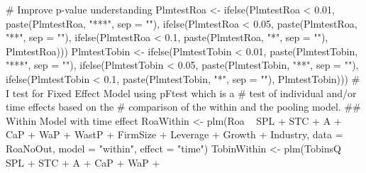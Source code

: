 \documentclass[12pt,]{article}
\newenvironment{Shaded}{}{}
\newcommand{\KeywordTok}[1]{\textcolor[rgb]{0.00,0.00,1.00}{#1}}
\newcommand{\DataTypeTok}[1]{#1}
\newcommand{\FloatTok}[1]{#1}
\newcommand{\StringTok}[1]{\textcolor[rgb]{0.00,0.50,0.50}{#1}}
\newcommand{\CommentTok}[1]{\textcolor[rgb]{0.00,0.50,0.00}{#1}}
\newcommand{\OperatorTok}[1]{#1}
\newcommand{\NormalTok}[1]{#1}
\begin{document}
\begin{Shaded}
\begin{Highlighting}[]
{{{{\CommentTok{# Improve p-value understanding}
\NormalTok{PlmtestRoa <-}\StringTok{ }\KeywordTok{ifelse}\NormalTok{(PlmtestRoa }\OperatorTok{<}\StringTok{ }\FloatTok{0.01}\NormalTok{, }\KeywordTok{paste}\NormalTok{(PlmtestRoa, }
    \StringTok{"***"}\NormalTok{, }\DataTypeTok{sep =} \StringTok{""}\NormalTok{), }\KeywordTok{ifelse}\NormalTok{(PlmtestRoa }\OperatorTok{<}\StringTok{ }\FloatTok{0.05}\NormalTok{, }\KeywordTok{paste}\NormalTok{(PlmtestRoa, }
    \StringTok{"**"}\NormalTok{, }\DataTypeTok{sep =} \StringTok{""}\NormalTok{), }\KeywordTok{ifelse}\NormalTok{(PlmtestRoa }\OperatorTok{<}\StringTok{ }\FloatTok{0.1}\NormalTok{, }\KeywordTok{paste}\NormalTok{(PlmtestRoa, }
    \StringTok{"*"}\NormalTok{, }\DataTypeTok{sep =} \StringTok{""}\NormalTok{), PlmtestRoa)))}
\NormalTok{PlmtestTobin <-}\StringTok{ }\KeywordTok{ifelse}\NormalTok{(PlmtestTobin }\OperatorTok{<}\StringTok{ }\FloatTok{0.01}\NormalTok{, }\KeywordTok{paste}\NormalTok{(PlmtestTobin, }
    \StringTok{"***"}\NormalTok{, }\DataTypeTok{sep =} \StringTok{""}\NormalTok{), }\KeywordTok{ifelse}\NormalTok{(PlmtestTobin }\OperatorTok{<}\StringTok{ }\FloatTok{0.05}\NormalTok{, }\KeywordTok{paste}\NormalTok{(PlmtestTobin, }
    \StringTok{"**"}\NormalTok{, }\DataTypeTok{sep =} \StringTok{""}\NormalTok{), }\KeywordTok{ifelse}\NormalTok{(PlmtestTobin }\OperatorTok{<}\StringTok{ }\FloatTok{0.1}\NormalTok{, }\KeywordTok{paste}\NormalTok{(PlmtestTobin, }
    \StringTok{"*"}\NormalTok{, }\DataTypeTok{sep =} \StringTok{""}\NormalTok{), PlmtestTobin)))}
\CommentTok{# I test for Fixed Effect Model using pFtest which is a}
\CommentTok{# test of individual and/or time effects based on the}
\CommentTok{# comparison of the within and the pooling model.}
\NormalTok{## Within Model with time effect}
\NormalTok{RoaWithin <-}\StringTok{ }\KeywordTok{plm}\NormalTok{(Roa }\OperatorTok{~}\StringTok{ }\NormalTok{SPL }\OperatorTok{+}\StringTok{ }\NormalTok{STC }\OperatorTok{+}\StringTok{ }\NormalTok{A }\OperatorTok{+}\StringTok{ }\NormalTok{CaP }\OperatorTok{+}\StringTok{ }\NormalTok{WaP }\OperatorTok{+}\StringTok{ }\NormalTok{WastP }\OperatorTok{+}\StringTok{ }
\StringTok{    }\NormalTok{FirmSize }\OperatorTok{+}\StringTok{ }\NormalTok{Leverage }\OperatorTok{+}\StringTok{ }\NormalTok{Growth }\OperatorTok{+}\StringTok{ }\NormalTok{Industry, }\DataTypeTok{data =}\NormalTok{ RoaNoOut, }
    \DataTypeTok{model =} \StringTok{"within"}\NormalTok{, }\DataTypeTok{effect =} \StringTok{"time"}\NormalTok{)}
\NormalTok{TobinWithin <-}\StringTok{ }\KeywordTok{plm}\NormalTok{(TobinsQ }\OperatorTok{~}\StringTok{ }\NormalTok{SPL }\OperatorTok{+}\StringTok{ }\NormalTok{STC }\OperatorTok{+}\StringTok{ }\NormalTok{A }\OperatorTok{+}\StringTok{ }\NormalTok{CaP }\OperatorTok{+}\StringTok{ }\NormalTok{WaP }\OperatorTok{+}\StringTok{ }
}}}}
\end{Highlighting}
\end{Shaded}
\end{document}
